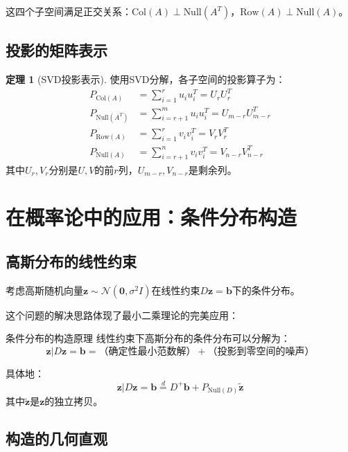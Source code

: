 \documentclass[11pt,a4paper]{ctexart}
\theoremstyle{definition}
\newtheorem{theorem}{定理}[section]
\newcommand{\Null}{\text{Null}}
\newcommand{\Col}{\text{Col}}
\newcommand{\Row}{\text{Row}}
\begin{document}
这四个子空间满足正交关系：$\Col(A) \perp \Null(A^T)$，$\Row(A) \perp \Null(A)$。

\subsection{投影的矩阵表示}

\begin{theorem}[SVD投影表示]
使用SVD分解，各子空间的投影算子为：
\begin{align}
P_{\Col(A)} &= \sum_{i=1}^r u_i u_i^T = U_r U_r^T \\
P_{\Null(A^T)} &= \sum_{i=r+1}^m u_i u_i^T = U_{m-r} U_{m-r}^T \\
P_{\Row(A)} &= \sum_{i=1}^r v_i v_i^T = V_r V_r^T \\
P_{\Null(A)} &= \sum_{i=r+1}^n v_i v_i^T = V_{n-r} V_{n-r}^T
\end{align}
其中$U_r, V_r$分别是$U, V$的前$r$列，$U_{m-r}, V_{n-r}$是剩余列。
\end{theorem}

\section{在概率论中的应用：条件分布构造}

\subsection{高斯分布的线性约束}

考虑高斯随机向量$\boldsymbol{z} \sim \mathcal{N}(\boldsymbol{0}, \sigma^2 I)$在线性约束$D\boldsymbol{z} = \boldsymbol{b}$下的条件分布。

这个问题的解决思路体现了最小二乘理论的完美应用：

\begin{keylemma}{条件分布的构造原理}
线性约束下高斯分布的条件分布可以分解为：
$$\boldsymbol{z} | D\boldsymbol{z} = \boldsymbol{b} = \text{（确定性最小范数解）} + \text{（投影到零空间的噪声）}$$

具体地：
$$\boldsymbol{z} | D\boldsymbol{z} = \boldsymbol{b} \stackrel{d}{=} D^+\boldsymbol{b} + P_{\Null(D)} \tilde{\boldsymbol{z}}$$
其中$\tilde{\boldsymbol{z}}$是$\boldsymbol{z}$的独立拷贝。
\end{keylemma}

\subsection{构造的几何直观}
\end{document}
